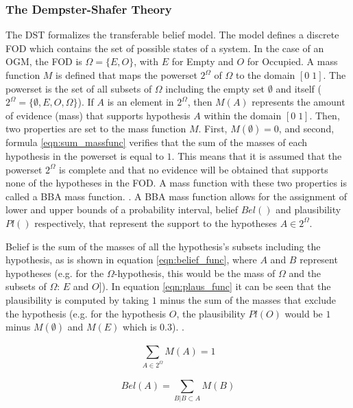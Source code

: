 \subsubsection{The Dempster-Shafer Theory}
The DST formalizes the transferable belief model. The model defines a discrete \gls{FOD} which contains the set of possible states of a system. In the case of an \gls{OGM}, the \gls{FOD} is $\Omega = \{E, O\}$, with $E$ for Empty and $O$ for Occupied. A mass function $M$ is defined that maps the powerset $2^\Omega$ of $\Omega$ to the domain $[0 \; 1]$. The powerset is the set of all subsets of $\Omega$ including the empty set $\emptyset$ and itself ($2^\Omega = \{\emptyset, E, O, \Omega \}$). If $A$ is an element in $2^\Omega$, then $M(A)$ represents the amount of evidence (mass) that supports hypothesis $A$ within the domain $[0 \; 1]$. Then, two properties are set to the mass function $M$. First, $M(\emptyset) = 0$, and second, formula \ref{eqn:sum_massfunc} verifies that the sum of the masses of each hypothesis in the powerset is equal to $1$. This means that it is assumed that the powerset $2^\Omega$ is complete and that no evidence will be obtained that supports none of the hypotheses in the \gls{FOD}. A mass function with these two properties is called a \gls{BBA} mass function. \cite{moras2014evidential}. A \gls{BBA} mass function allows for the assignment of lower and upper bounds of a probability interval, belief $Bel()$ and plausibility $Pl()$ respectively, that represent the support to the hypotheses $A \in 2^\Omega$.

Belief is the sum of the masses of all the hypothesis's subsets including the hypothesis, as is shown in equation \ref{eqn:belief_func}, where $A$ and $B$ represent hypotheses (e.g. for the $\Omega$-hypothesis, this would be the mass of $\Omega$ and the subsets of $\Omega$: $E$ and $O$]).
In equation \ref{eqn:plaus_func} it can be seen that the plausibility is computed by taking $1$ minus the sum of the masses that exclude the hypothesis (e.g. for the hypothesis $O$, the plausibility $Pl(O)$ would be $1$ minus $M(\emptyset)$ and $M(E)$ which is $0.3$). \cite{moras2014evidential}.

\begin{equation} \label{eqn:sum_massfunc}
	\sum_{A \in 2^\Omega}^{} M(A) = 1 
\end{equation}

\begin{equation} \label{eqn:belief_func}
	Bel(A) = \sum_{B|B \subset A}^{} M(B) 
\end{equation}

